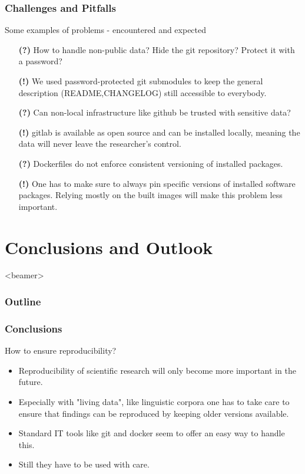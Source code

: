 \documentclass[]{beamer}
\begin{document}
    \begin{frame}
        \frametitle{Challenges and Pitfalls}
        \begin{block}{Some examples of problems - encountered and expected}
            \begin{itemize}
				\pause
				\item[\textbf{(?)}] How to handle non-public data? Hide the git repository? Protect it with a password?
				\pause
				\item[\textbf{(!)}] We used password-protected git submodules to keep the general description (README,CHANGELOG) still accessible to everybody.
				\pause
				\item[\textbf{(?)}] Can non-local infrastructure like github be trusted with sensitive data?
				\pause
				\item[\textbf{(!)}] gitlab is available as open source and can be installed locally, meaning the data will never leave the researcher's control.
				\pause
	 			\item[\textbf{(?)}] Dockerfiles do not enforce consistent versioning of installed packages.
				\pause
				\item[\textbf{(!)}] One has to make sure to always pin specific versions of installed software packages. Relying mostly on the built images will make this problem less important.
	     	\end{itemize}
        \end{block}
    \end{frame}

	\section[p.five]{Conclusions and Outlook}
	{%
	\begin{frame}<beamer>
	    \frametitle{Outline}
	\tableofcontents[currentsection]
	\end{frame}
	}

	\begin{frame}
        \frametitle{Conclusions}
        \begin{block}{How to ensure reproducibility?}
            \begin{itemize}
				\item Reproducibility of scientific research will only become more important in the future.
				\pause
				\item Especially with "living data", like linguistic corpora one has to take care to ensure that findings can be reproduced by keeping older versions available.
				\pause
				\item Standard IT tools like git and docker seem to offer an easy way to handle this.
				\pause
	 			\item Still they have to be used with care.
	     	\end{itemize}
        \end{block}
    \end{frame}
\end{document}

